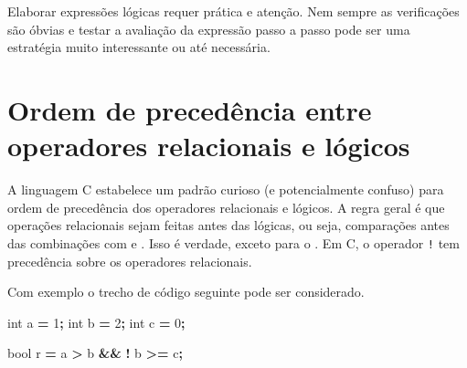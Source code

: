 \documentclass[
  11pt,
  a4paper,
]{scrbook}
\newenvironment{Shaded}{\begin{snugshade}}{\end{snugshade}}
\newcommand{\DataTypeTok}[1]{\textcolor[rgb]{0.13,0.29,0.53}{#1}}
\newcommand{\DecValTok}[1]{\textcolor[rgb]{0.00,0.00,0.81}{#1}}
\newcommand{\NormalTok}[1]{#1}
\newcommand{\OperatorTok}[1]{\textcolor[rgb]{0.81,0.36,0.00}{\textbf{#1}}}
\begin{document}
\begin{tcolorbox}[enhanced jigsaw, arc=.35mm, bottomtitle=1mm, colbacktitle=quarto-callout-tip-color!10!white, title=\textcolor{quarto-callout-tip-color}{\faLightbulb}\hspace{0.5em}{Dica}, toprule=.15mm, left=2mm, opacityback=0, colback=white, colframe=quarto-callout-tip-color-frame, opacitybacktitle=0.6, bottomrule=.15mm, leftrule=.75mm, toptitle=1mm, coltitle=black, titlerule=0mm, rightrule=.15mm, breakable]

Elaborar expressões lógicas requer prática e atenção. Nem sempre as
verificações são óbvias e testar a avaliação da expressão passo a passo
pode ser uma estratégia muito interessante ou até necessária.

\end{tcolorbox}

\section{Ordem de precedência entre operadores relacionais e
lógicos}\label{ordem-de-preceduxeancia-entre-operadores-relacionais-e-luxf3gicos}

A linguagem C estabelece um padrão curioso (e potencialmente confuso)
para ordem de precedência dos operadores relacionais e lógicos. A regra
geral é que operações relacionais sejam feitas antes das lógicas, ou
seja, comparações antes das combinações com
{} e
{}. Isso é
verdade, exceto para o
{}. Em C, o
operador \texttt{!} tem precedência sobre os operadores relacionais.

Com exemplo o trecho de código seguinte pode ser considerado.

\begin{Shaded}
\begin{Highlighting}[]
\DataTypeTok{int}\NormalTok{ a }\OperatorTok{=} \DecValTok{1}\OperatorTok{;}
\DataTypeTok{int}\NormalTok{ b }\OperatorTok{=} \DecValTok{2}\OperatorTok{;}
\DataTypeTok{int}\NormalTok{ c }\OperatorTok{=} \DecValTok{0}\OperatorTok{;}

\DataTypeTok{bool}\NormalTok{ r }\OperatorTok{=}\NormalTok{ a }\OperatorTok{\textgreater{}}\NormalTok{ b }\OperatorTok{\&\&} \OperatorTok{!}\NormalTok{ b }\OperatorTok{\textgreater{}=}\NormalTok{ c}\OperatorTok{;}
\end{Highlighting}
\end{Shaded}
\end{document}
